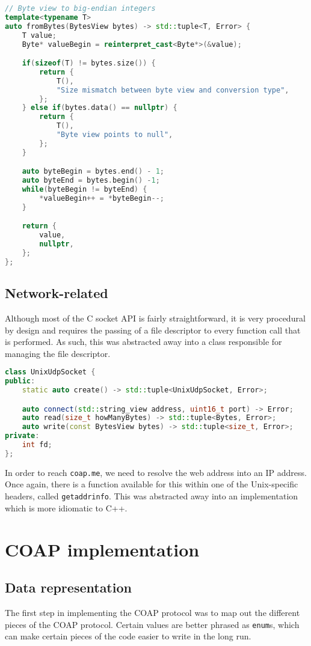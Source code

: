 \documentclass[a4paper, titlepage,12pt]{article}
\begin{document}
		\begin{lstlisting}[language=C++]
// Byte view to big-endian integers
template<typename T>
auto fromBytes(BytesView bytes) -> std::tuple<T, Error> {
	T value;
	Byte* valueBegin = reinterpret_cast<Byte*>(&value);

	if(sizeof(T) != bytes.size()) {
		return {
			T(),
			"Size mismatch between byte view and conversion type",
		};
	} else if(bytes.data() == nullptr) {
		return {
			T(),
			"Byte view points to null",
		};
	}

	auto byteBegin = bytes.end() - 1;
	auto byteEnd = bytes.begin() -1;
	while(byteBegin != byteEnd) {
		*valueBegin++ = *byteBegin--;
	}

	return {
		value,
		nullptr,
	};
};
		\end{lstlisting}

		\subsection{Network-related}
		Although most of the C socket API is fairly straightforward, it is very procedural by design and requires the passing of a file descriptor to every function call that is performed. As such, this was abstracted away into a class responsible for managing the file descriptor.

		\begin{lstlisting}[language=C++]
class UnixUdpSocket {
public:
	static auto create() -> std::tuple<UnixUdpSocket, Error>;

	auto connect(std::string_view address, uint16_t port) -> Error;
	auto read(size_t howManyBytes) -> std::tuple<Bytes, Error>;
	auto write(const BytesView bytes) -> std::tuple<size_t, Error>;
private:
	int fd;
};
		\end{lstlisting}

		In order to reach \lstinline{coap.me}, we need to resolve the web address into an IP address. Once again, there is a function available for this within one of the Unix-specific headers, called \lstinline{getaddrinfo}\cite{getaddrinfo}. This was abstracted away into an implementation which is more idiomatic to C++.
	
	\section{COAP implementation}
		\subsection{Data representation}
		The first step in implementing the COAP protocol was to map out the different pieces of the COAP protocol. Certain values are better phrased as \lstinline{enum}s, which can make certain pieces of the code easier to write in the long run.
\end{document}
